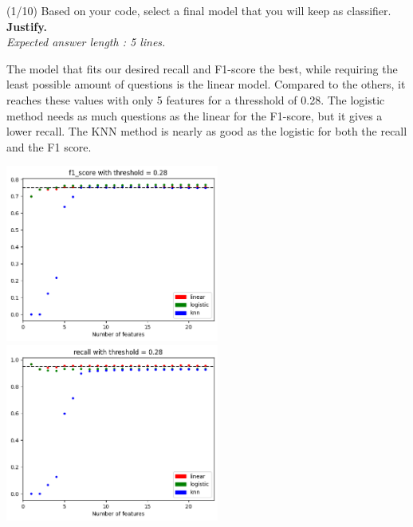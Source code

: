 \documentclass [a4paper, 11pt] {article}
\begin{document}
\begin{question}{2.3}
(1/10) Based on your code, select a final model that you will keep as classifier. \textbf{Justify.} \\
\textit{Expected answer length : 5 lines.}
\end{question}
\begin{answer} \color{blue}
The model that fits our desired recall and F1-score the best, while requiring the least possible amount of questions is the linear model. Compared to the others, it reaches these values with only 5 features for a thresshold of 0.28.
The logistic method needs as much questions as the linear for the F1-score, but it gives a lower recall. The KNN method is nearly as good as the logistic for both the recall and the F1 score.
\begin{center}
    \includegraphics[width=7cm]{5_2_F.png}
    \includegraphics[width=7cm]{5_2_R.png}   
\end{center}
\end{answer}
\end{document}
